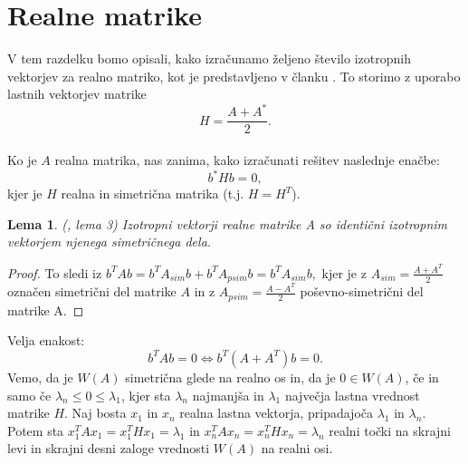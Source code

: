 \documentclass[12pt,a4paper]{amsart}
\theoremstyle{definition}
\theoremstyle{plain}
\newtheorem{lema}[definicija]{Lema}
\begin{document}
\section{Realne matrike}\label{Realne matrike}
V tem razdelku bomo opisali, kako izračunamo željeno število izotropnih vektorjev za realno matriko, kot je predstavljeno v članku \cite{meurant}. To storimo z uporabo lastnih vektorjev matrike $$H=\frac{A+A^\ast}{2}.$$\\
Ko je $A$ realna matrika, nas zanima, kako izračunati rešitev naslednje enačbe:
\begin{equation}\label{eq:realna}
b^\ast Hb=0,
\end{equation}
kjer je $H$ realna in simetrična matrika (t.j. $H=H^T$).
\begin{lema} (\cite{lipkin}, lema 3)
Izotropni vektorji realne matrike A so identični izotropnim vektorjem njenega simetričnega dela.
\end{lema} 
\begin{proof}
To sledi iz $b^T Ab=b^T A_{sim} b +b^T A_{psim} b=b^T A_{sim} b,$ kjer je z $A_{sim}=\frac{A+A^T}{2}$ označen simetrični del matrike $A$ in z $A_{psim}=\frac{A-A^T}{2}$ poševno-simetrični del matrike A.
\end{proof}
Velja enakost:
$$b^T Ab=0 \Leftrightarrow b^T (A+A^T)b=0.$$  
Vemo, da je $W(A)$ simetrična glede na realno os in, da je $0 \in W(A)$, če in samo če $\lambda_n\le0\le\lambda_1$, kjer sta $\lambda_n$ najmanjša in $\lambda_1$ največja lastna vrednost matrike $H$. Naj bosta $x_1$ in $x_n$ realna lastna vektorja, pripadajoča $\lambda_1$ in $\lambda_n$.  Potem sta $x_1^T Ax_1=x_1^T Hx_1=\lambda_1$ in $x_n^T Ax_n=x_n^T Hx_n=\lambda_n$ realni točki na skrajni levi in skrajni desni zaloge vrednosti $W(A)$ na realni osi.\\
\end{document}
